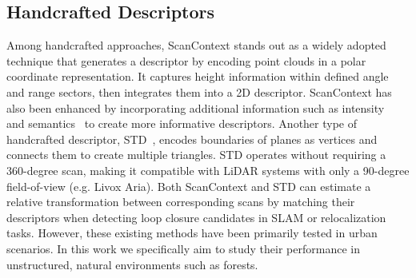 \subsection*{Handcrafted Descriptors} 
Among handcrafted approaches, ScanContext\cite{kim2018iros,kim2021tro} stands out as a widely adopted technique that generates a descriptor by encoding point clouds in a polar coordinate representation. It captures height information within defined angle and range sectors, then integrates them into a 2D descriptor. 
ScanContext has also been enhanced by incorporating additional information such as intensity~\cite{wang2020icra} and semantics~\cite{li2021iros} to create more informative descriptors. 
Another type of handcrafted descriptor, STD~\cite{yuan2023icra}, encodes boundaries of planes as vertices and connects them to create multiple triangles. STD operates without requiring a 360-degree scan, making it compatible with LiDAR systems with only a 90-degree field-of-view (e.g. Livox Aria). Both ScanContext and STD can estimate a relative transformation between corresponding scans by matching their descriptors when detecting loop closure candidates in SLAM or relocalization tasks. However, these existing methods have been primarily tested in urban scenarios. In this work we specifically aim to study their performance in unstructured, natural environments such as forests.

